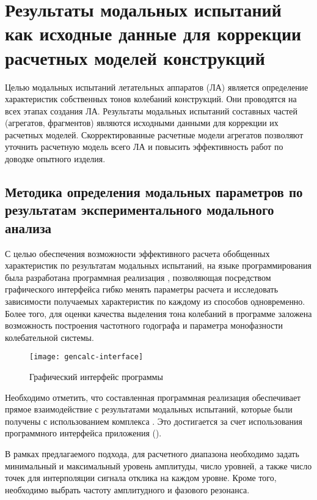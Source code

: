 \chapter{Результаты модальных испытаний как исходные данные для коррекции расчетных моделей конструкций}

Целью модальных испытаний летательных аппаратов (ЛА) является определение характеристик собственных тонов колебаний конструкций. Они проводятся на всех этапах создания ЛА. Результаты модальных испытаний составных частей (агрегатов, фрагментов) являются исходными данными для коррекции их расчетных моделей. Скорректированные расчетные модели агрегатов позволяют уточнить расчетную модель всего ЛА и повысить эффективность работ по доводке опытного изделия. 

\section{Методика определения модальных параметров по результатам экспериментального модального анализа}

С целью обеспечения возможности эффективного расчета обобщенных характеристик по результатам модальных испытаний, на языке программирования  была разработана программная реализация , позволяющая посредством графического интерфейса  гибко менять параметры расчета и исследовать зависимости получаемых характеристик по каждому из способов одновременно. Более того, для оценки качества выделения тона колебаний в программе заложена возможность построения частотного годографа  и параметра монофазности  колебательной системы.

\begin{figure}[!htb]
	\centerfloat
	\texttt{[image: gencalc-interface]}
	\caption{Графический интерфейс программы} \label{fig:gencalc-interface}
\end{figure}

Необходимо отметить, что составленная программная реализация обеспечивает прямое взаимодействие с результатами модальных испытаний, которые были получены с использованием комплекса . Это достигается за счет использования программного интерфейса приложения  ().

В рамках предлагаемого подхода, для расчетного диапазона необходимо задать минимальный и максимальный уровень амплитуды, число уровней, а также число точек для интерполяции сигнала отклика на каждом уровне. Кроме того, необходимо выбрать частоту амплитудного и фазового резонанса.

